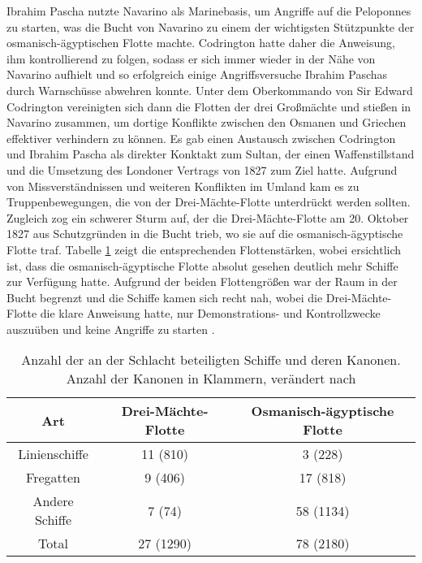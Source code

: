 \documentclass[preprint]{geomorphica} %
\begin{document}
Ibrahim Pascha nutzte Navarino als Marinebasis, um Angriffe auf die Peloponnes zu starten, was die Bucht von Navarino zu einem der wichtigsten Stützpunkte der osmanisch-ägyptischen Flotte machte. 
Codrington hatte daher die Anweisung, ihm kontrollierend zu folgen, sodass er sich immer wieder in der Nähe von Navarino aufhielt und so erfolgreich einige Angriffsversuche Ibrahim Paschas durch Warnschüsse abwehren konnte.
Unter dem Oberkommando von Sir Edward Codrington vereinigten sich dann die Flotten der drei Großmächte und stießen in Navarino zusammen, um dortige Konflikte zwischen den Osmanen und Griechen effektiver verhindern zu können.
Es gab einen Austausch zwischen Codrington und Ibrahim Pascha als direkter Konktakt zum Sultan, der einen Waffenstillstand und die Umsetzung des Londoner Vertrags von 1827 zum Ziel hatte.
Aufgrund von Missverständnissen und weiteren Konflikten im Umland kam es zu Truppenbewegungen, die von der Drei-Mächte-Flotte unterdrückt werden sollten.
Zugleich zog ein schwerer Sturm auf, der die Drei-Mächte-Flotte am 20. Oktober 1827 aus Schutzgründen in die Bucht trieb, wo sie auf die osmanisch-ägyptische Flotte traf.
Tabelle \ref{tab:schlachtschiffe} zeigt die entsprechenden Flottenstärken, wobei ersichtlich ist, dass die osmanisch-ägyptische Flotte absolut gesehen deutlich mehr Schiffe zur Verfügung hatte.
Aufgrund der beiden Flottengrößen war der Raum in der Bucht begrenzt und die Schiffe kamen sich recht nah, wobei die Drei-Mächte-Flotte die klare Anweisung hatte, nur Demonstrations- und Kontrollzwecke auszuüben und keine Angriffe zu starten \cite{James1837, Anderson1966, Dakin1973, Clogg1979, Forster1958, Schulz2011, Woodhouse1965}.

\begin{table}[h]
    \caption{Anzahl der an der Schlacht beteiligten Schiffe und deren Kanonen. Anzahl der Kanonen in Klammern, verändert nach \cite{James1837}}
    \begin{center}
        \begin{tabular}{c c c}
            \hline
            Art & Drei-Mächte-Flotte & Osmanisch-ägyptische Flotte \\
            \hline
            Linienschiffe & 11 (810) & 3 (228) \\
            Fregatten & 9 (406) & 17 (818) \\
            Andere Schiffe & 7 (74) & 58 (1134) \\
            \hline
            Total & 27 (1290) & 78 (2180) \\
            \hline
        \end{tabular}
    \end{center}
    \label{tab:schlachtschiffe}
\end{table}
\end{document}
